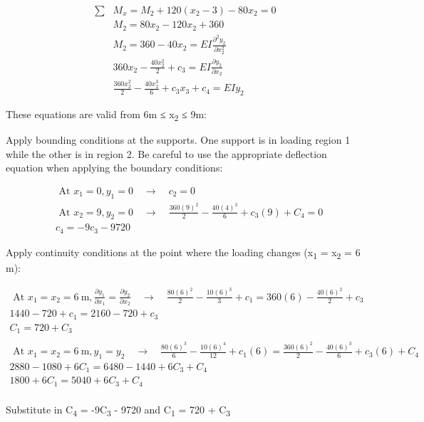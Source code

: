 \documentclass[
  letterpaper,
  DIV=11,
  numbers=noendperiod]{scrreprt}
\begin{document}
\begin{tcolorbox}
\begin{tcolorbox}
\[
\begin{aligned}
\sum & M_x= M_2+120\left(x_2-3\right)-80 x_2=0 \\ 
&M_2  =80 x_2-120 x_2+360 \\ 
&M_2 =360-40 x_2=E I \frac{\partial^2 y_2}{\partial x_2^2} \\ 
&360 x_2-\frac{40 x_2^2}{2}+c_3=E I \frac{\partial y_2}{\partial x_2} \\ 
&\frac{360 x_2^2}{2}-\frac{40 x_2^3}{6}+c_3 x_3+c_4  =E I y_2
\end{aligned}
\]

These equations are valid from 6m ≤ x\textsubscript{2} ≤ 9m:

Apply bounding conditions at the supports. One support is in loading
region 1 while the other is in region 2. Be careful to use the
appropriate deflection equation when applying the boundary conditions:

\[
\begin{aligned} & \text { At } x_1=0, y_1=0 \quad \rightarrow \quad c_2=0 \\ & \text { At } x_2=9, y_2=0 \quad \rightarrow \quad \frac{360(9)^2}{2}-\frac{40(4)^3}{6}+c_3(9) +C_4=0 \\ & c_4=-9 c_3-9720\end{aligned}
\]

Apply continuity conditions at the point where the loading changes
(x\textsubscript{1} = x\textsubscript{2} = 6 m):

\[
\begin{gathered} \text { At } x_1=x_2=6 \mathrm{~m}, \frac{\partial y_1}{\partial x_1}=\frac{\partial y_2}{\partial x_2} \quad \rightarrow \quad \frac{80(6)^2}{2}-\frac{10(6)^3}{3}+c_1=360(6)-\frac{40(6)^2}{2}+c_3 \\ 1440-720+c_1=2160-720+c_3 \\ C_1=720+C_3 \\ \\  \text { At } x_1=x_2=6 \mathrm{~m}, y_1=y_2 \quad \rightarrow \quad\frac{80(6)^3}{6}-\frac{10(6)^4}{12}+c_1(6)=\frac{360(6)^2}{2} - \frac{40(6)^3}{6}+c_3(6) +C_4 \\ 2880-1080+6 C_1=6480-1440+6 C_3+C_4 \\ 1800+6 C_1=5040+6 C_3+C_4 \\\end{gathered}
\]

Substitute in C\textsubscript{4} = -9C\textsubscript{3} - 9720 and
C\textsubscript{1} = 720 + C\textsubscript{3}


\end{tcolorbox}
\end{tcolorbox}
\end{document}
